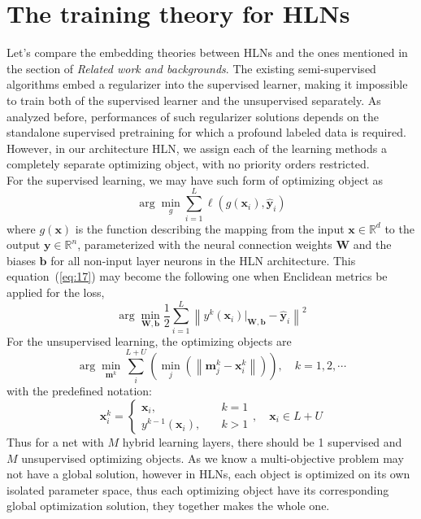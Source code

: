 \documentclass[3p,times,procedia]{elsarticle}
\begin{document}
\section{The training theory for HLNs}
Let's compare the embedding theories between
HLNs and the ones mentioned in the section of
\emph{Related work and backgrounds}.
The existing semi-supervised algorithms
embed a regularizer into the supervised 
learner, making it impossible to train both of
the supervised learner and the unsupervised
separately. As analyzed before, performances
of such regularizer solutions depends on the
standalone supervised pretraining for which
a profound labeled data is required.
However, in our architecture HLN, we assign
each of the learning methods a completely
separate optimizing object, with no priority
orders restricted.\\
For the supervised learning, we may have such
form of optimizing object as
\begin{equation}
	\arg \min_g \sum_{i=1}^L\ell\left(
	g(\mathbf{x}_i),
	\mathbf{\hat{y}}_i
	\right)
	\label{eq:17}
\end{equation}
where $g(\mathbf{x})$ is the function describing
the mapping from the input 
$\mathbf{x}\in\mathbb{R}^d$ to the output
$\mathbf{y}\in\mathbb{R}^n$, parameterized with
the neural connection weights $\mathbf{W}$ and 
the biases $\mathbf{b}$ for all non-input 
layer neurons in the HLN architecture.
This equation~(\ref{eq:17}) may become the 
following one when Enclidean metrics be 
applied for the loss,
\begin{equation}
	\arg \min_{\mathbf{W},\mathbf{b}}
	\frac{1}{2}
	\sum_{i=1}^L
	\left\|
	y^k(
	\mathbf{x}_i)\big|_{\mathbf{W},\mathbf{b}}-
	\mathbf{\hat{y}}_i
	\right\|^2
	\label{eq:18}
\end{equation}
For the unsupervised learning, the optimizing
objects are
\begin{equation}
	\arg \min_{\mathbf{m}^k}
	\sum_i^{L+U}
	\left(
	\min_j\left(
	\left\|
	\mathbf{m}^k_j-\mathbf{x}^k_i
	\right\|
	\right)
	\right),\quad k=1,2,\cdots
	\label{eq:19}
\end{equation}
with the predefined notation:
\begin{equation}
	\mathbf{x}_i^k=
	\left\{
		\begin{aligned}
			\mathbf{x}_i,\quad & k=1\\
			y^{k-1}(\mathbf{x}_i),\quad & k>1
		\end{aligned}
	\right.
	,\quad \mathbf{x}_i\in L+U
	\label{eq:20}
\end{equation}
Thus for a net with $M$ hybrid learning layers,
there should be 1 supervised
and $M$ unsupervised optimizing objects.
As we know a multi-objective problem may not 
have a global solution, however in HLNs,
each object is optimized on its own isolated
parameter space, thus each optimizing object
have its corresponding global optimization 
solution, they together makes the whole one.
\end{document}
